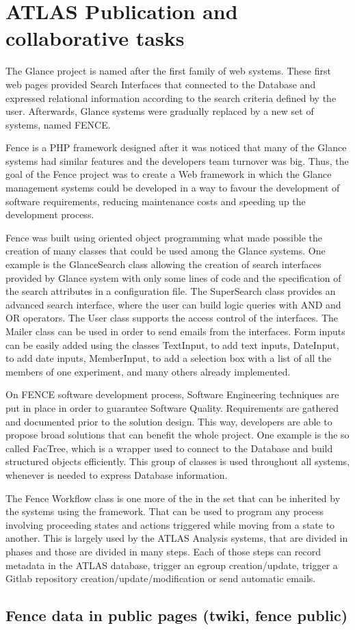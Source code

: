 \section{ATLAS Publication and collaborative tasks}
\label{sec:collaborative-tasks}
The Glance project is named after the first family of web systems. These first web pages provided Search Interfaces that connected to the Database and expressed relational information according to the search criteria defined by the user. Afterwards, Glance systems were gradually replaced by a new set of systems, named FENCE.

Fence is a PHP framework designed after it was noticed that many of the Glance systems had similar features and the developers team turnover was big. Thus, the goal of the Fence project was to create a Web framework in which the Glance management systems could be developed in a way to favour the development of software requirements, reducing maintenance costs and speeding up the development process.

Fence was built using oriented object programming what made possible the creation of many classes that could be used among the Glance systems. One example is the GlanceSearch class allowing the creation of search interfaces provided by Glance system with only some lines of code and the specification of the search attributes in a configuration file. The SuperSearch class provides an advanced search interface, where the user can build logic queries with AND and OR operators. The User class supports the access control of the interfaces. The Mailer class can be used in order to send emails from the interfaces. Form inputs can be easily added using the classes TextInput, to add text inputs, DateInput, to add date inputs, MemberInput, to add a selection box with a list of all the members of one experiment, and many others already implemented.

On FENCE software development process, Software Engineering techniques are put in place in order to guarantee Software Quality. Requirements are gathered and documented prior to the solution design. This way, developers are able to propose broad solutions that can benefit the whole project. One example is the so called FacTree, which is a wrapper used to connect to the Database and build structured objects efficiently. This group of classes is used throughout all systems, whenever is needed to express Database information.

The Fence Workflow class is one more of the in the set that can be inherited by the systems using the framework. That can be used to program any process involving proceeding states and actions triggered while moving from a state to another. This is largely used by the ATLAS Analysis systems, that are divided in phases and those are divided in many steps. Each of those steps can record metadata in the ATLAS database, trigger an egroup creation/update, trigger a Gitlab repository creation/update/modification or send automatic emails.

\subsection{Fence data in public pages (twiki, fence public)}

